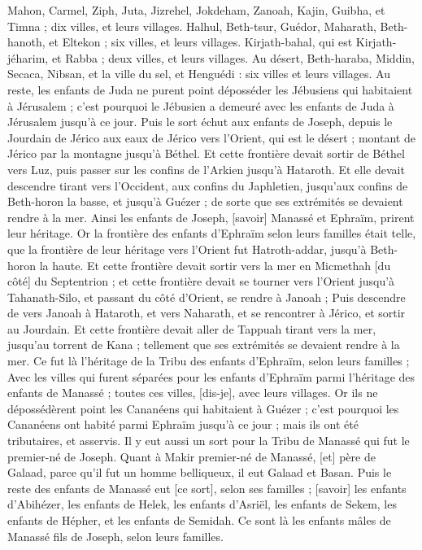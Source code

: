 \begin{multicols}{2}
Mahon, Carmel, Ziph, Juta,
Jizrehel, Jokdeham, Zanoah,
Kajin, Guibha, et Timna ; dix villes, et leurs villages.
Halhul, Beth-tsur, Guédor,
Maharath, Beth-hanoth, et Eltekon ; six villes, et leurs villages.
Kirjath-bahal, qui est Kirjath-jéharim, et Rabba ; deux villes, et leurs villages.
Au désert, Beth-haraba, Middin, Secaca,
Nibsan, et la ville du sel, et Henguédi : six villes et leurs villages.
Au reste, les enfants de Juda ne purent point déposséder les Jébusiens qui habitaient à Jérusalem ; c'est pourquoi le Jébusien a demeuré avec les enfants de Juda à Jérusalem jusqu'à ce jour.
\VerseOne{}Puis le sort échut aux enfants de Joseph, depuis le Jourdain de Jérico aux eaux de Jérico vers l'Orient, qui est le désert ; montant de Jérico par la montagne jusqu'à Béthel.
Et cette frontière devait sortir de Béthel vers Luz, puis passer sur les confins de l'Arkien jusqu'à Hataroth.
Et elle devait descendre tirant vers l'Occident, aux confins du Japhletien, jusqu'aux confins de Beth-horon la basse, et jusqu'à Guézer ; de sorte que ses extrémités se devaient rendre à la mer.
Ainsi les enfants de Joseph, [savoir] Manassé et Ephraïm, prirent leur héritage.
Or la frontière des enfants d'Ephraïm selon leurs familles était telle, que la frontière de leur héritage vers l'Orient fut Hatroth-addar, jusqu'à Beth-horon la haute.
Et cette frontière devait sortir vers la mer en Micmethah [du côté] du Septentrion ; et cette frontière devait se tourner vers l'Orient jusqu'à Tahanath-Silo, et passant du côté d'Orient, se rendre à Janoah ;
Puis descendre de vers Janoah à Hataroth, et vers Naharath, et se rencontrer à Jérico, et sortir au Jourdain.
Et cette frontière devait aller de Tappuah tirant vers la mer, jusqu'au torrent de Kana ; tellement que ses extrémités se devaient rendre à la mer. Ce fut là l'héritage de la Tribu des enfants d'Ephraïm, selon leurs familles ;
Avec les villes qui furent séparées pour les enfants d'Ephraïm parmi l'héritage des enfants de Manassé ; toutes ces villes, [dis-je], avec leurs villages.
Or ils ne dépossédèrent point les Cananéens qui habitaient à Guézer ; c'est pourquoi les Cananéens ont habité parmi Ephraïm jusqu'à ce jour ; mais ils ont été tributaires, et asservis.
\VerseOne{}Il y eut aussi un sort pour la Tribu de Manassé qui fut le premier-né de Joseph. Quant à Makir premier-né de Manassé, [et] père de Galaad, parce qu'il fut un homme belliqueux, il eut Galaad et Basan.
Puis le reste des enfants de Manassé eut [ce sort], selon ses familles ; [savoir] les enfants d'Abihézer, les enfants de Helek, les enfants d'Asriël, les enfants de Sekem, les enfants de Hépher, et les enfants de Semidah. Ce sont là les enfants mâles de Manassé fils de Joseph, selon leurs familles.

\end{multicols}
